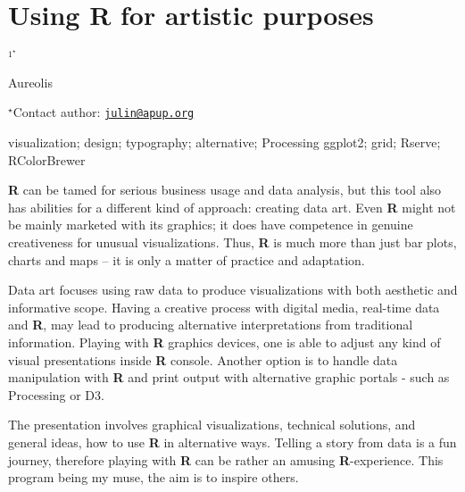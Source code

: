 \documentclass[\main/boa.tex]{subfiles}
\begin{document}
\section{Using R for artistic purposes}

\begin{center}
  {\bf {}$^{1^\star}$}
\end{center}

\vskip 0.3cm

\begin{affiliations}
\begin{enumerate}
\begin{minipage}{0.915\textwidth}
\centering
\item Aureolis \\[-2pt]
\end{minipage}
\end{enumerate}
$^\star$Contact author: \href{mailto:julin@apup.org}{\nolinkurl{julin@apup.org}}\\
\end{affiliations}

\vskip 0.5cm

\begin{minipage}{0.915\textwidth}
\keywords visualization; design; typography; alternative; Processing
\packages ggplot2; grid; Rserve; RColorBrewer
\end{minipage}

\vskip 0.8cm

\textbf{R} can be tamed for serious business usage and data analysis,
but this tool also has abilities for a different kind of approach:
creating data art. Even \textbf{R} might not be mainly marketed with its
graphics; it does have competence in genuine creativeness for unusual
visualizations. Thus, \textbf{R} is much more than just bar plots,
charts and maps -- it is only a matter of practice and adaptation.

Data art focuses using raw data to produce visualizations with both
aesthetic and informative scope. Having a creative process with digital
media, real-time data and \textbf{R}, may lead to producing alternative
interpretations from traditional information. Playing with \textbf{R}
graphics devices, one is able to adjust any kind of visual presentations
inside \textbf{R} console. Another option is to handle data manipulation
with \textbf{R} and print output with alternative graphic portals - such
as Processing or D3.

The presentation involves graphical visualizations, technical solutions,
and general ideas, how to use \textbf{R} in alternative ways. Telling a
story from data is a fun journey, therefore playing with \textbf{R} can
be rather an amusing \textbf{R}-experience. This program being my muse,
the aim is to inspire others.
\end{document}
